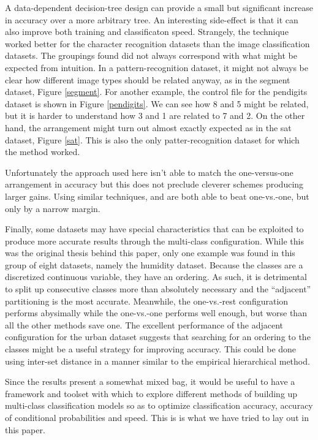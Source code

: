 \documentclass{article}
\begin{document}
A data-dependent decision-tree design can provide a small but significant
increase in accuracy over a more arbitrary tree.
An interesting side-effect is
that it can also improve both training and classificaton speed.
Strangely, the technique worked better for the character recognition datasets than
the image classification datasets.
The groupings found did not always correspond with what might be
expected from intuition.
In a pattern-recognition dataset, it might not always be clear  
how different image types should be related anyway, as in
the segment dataset, Figure \ref{segment}.
For another example, the control file for the pendigits dataset is shown in Figure \ref{pendigits}.
We can see how 8 and 5 might be related, but it is harder to
understand how 3 and 1 are related to 7 and 2.
On the other hand, the arrangement might turn out almost exactly
expected as in the sat dataset, Figure \ref{sat}.
This is also the only patter-recognition dataset for which the method worked.

Unfortunately the approach used here isn't able to match the one-versus-one 
arrangement in accuracy but
this does not preclude cleverer schemes producing larger gains.
Using similar techniques, \citet{Benabdeslem_Bennani2006} and \citet{Zhou_etal2008} are both able to beat one-vs.-one, but only by a narrow margin.

Finally, some datasets may have special characteristics that can be exploited
to produce more accurate results through the multi-class configuration.
While this was the original thesis behind this paper,
only one example was found in this group of eight datasets, 
namely the humidity dataset.
Because the classes are a discretized continuous variable, they have an
ordering. As such, it is detrimental to split up consecutive classes more
than absolutely necessary and the ``adjacent'' partitioning is the most
accurate. Meanwhile, the one-vs.-rest configuration performs abysimally while
the one-vs.-one performs well enough, but worse than all the other methods
save one.
The excellent performance of the adjacent configuration for the urban
dataset suggests that searching for an ordering to the classes might be a
useful strategy for improving accuracy.
This could be done using inter-set distance in a manner similar to the empirical hierarchical method.

Since the results present a somewhat mixed bag, it would be useful to
have a framework and toolset with which to explore different methods of
building up multi-class classification models so as to optimize classification
accuracy, accuracy of conditional probabilities and speed.
This is is what we have tried to lay out in this paper.



\end{document}
